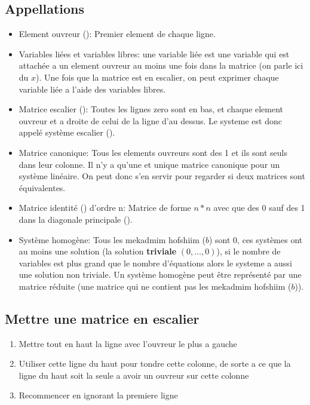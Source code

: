\documentclass[12pt]{article}
\begin{document}
\subsection{Appellations}
\begin{itemize}
  \item Element ouvreur (): Premier element de chaque ligne.
  \item  Variables liées et variables libres: une variable liée est une variable qui est attachée a un element ouvreur au moins une fois dans la matrice (on parle ici du $x$). Une fois que la matrice est en escalier, on peut exprimer chaque variable liée a l'aide des variables libres.
  \item Matrice escalier (): Toutes les lignes zero sont en bas, et chaque element ouvreur et a droite de celui de la ligne d'au dessus. Le systeme est donc appelé système escalier ().
    \item  Matrice canonique: Tous les elements ouvreurs sont des 1 et ils sont seuls dans leur colonne. Il n'y a qu'une et unique matrice canonique pour un système linéaire. On peut donc s'en servir pour regarder si deux matrices sont équivalentes. 
    \item  Matrice identité () d'ordre n: Matrice de forme $n*n$ avec que des 0 sauf des 1 dans la diagonale principale ().
    \item Système homogène: Tous les mekadmim hofshiim ($b$) sont 0, ces systèmes ont au moins une solution (la solution \textbf{triviale} $(0, \ldots, 0)$), si le nombre de variables est plus grand que le nombre d'équations alors le systeme a aussi une solution non triviale. Un système homogène peut être représenté par une matrice réduite (une matrice qui ne contient pas les mekadmim hofshiim ($b$)).
\end{itemize}

\subsection{Mettre une matrice en escalier}
\begin{enumerate}
  \item Mettre tout en haut la ligne avec l'ouvreur le plus a gauche
    \item Utiliser cette ligne du haut pour tondre cette colonne, de sorte a ce que la ligne du haut soit la seule a avoir un ouvreur sur cette colonne
      \item Recommencer en ignorant la premiere ligne
\end{enumerate}
\end{document}
